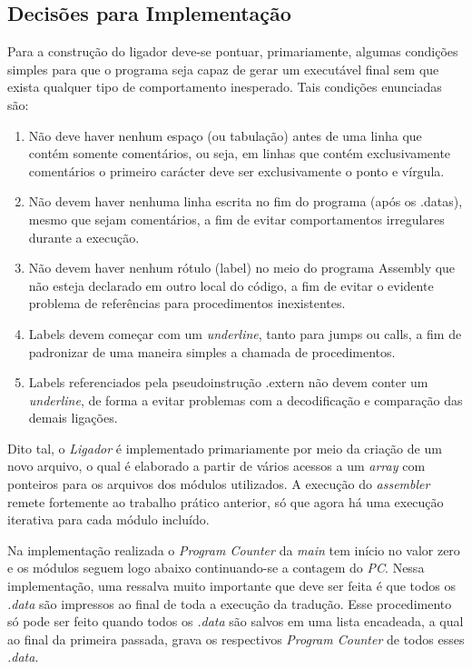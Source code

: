 \documentclass{article}
\begin{document}
\subsection{Decisões para Implementação}
Para a construção do ligador deve-se pontuar, primariamente, algumas condições simples para que o programa seja capaz de gerar um executável final sem que exista qualquer tipo de comportamento inesperado. Tais condições enunciadas são:

\begin{enumerate}
  \item Não deve haver nenhum espaço (ou tabulação) antes de uma linha que contém somente comentários, ou seja, em linhas que contém exclusivamente comentários o primeiro carácter deve ser exclusivamente o ponto e vírgula.
  \item Não devem haver nenhuma linha escrita no fim do programa (após os .datas), mesmo que sejam comentários, a fim de evitar comportamentos irregulares durante a execução.
  \item Não devem haver nenhum rótulo (label) no meio do programa Assembly que não esteja declarado em outro local do código, a fim de evitar o evidente problema de referências para procedimentos inexistentes.
  \item Labels devem começar com um \textit{underline}, tanto para jumps ou calls, a fim de padronizar de uma maneira simples a chamada de procedimentos.
  \item Labels referenciados pela pseudoinstrução .extern não devem conter um \textit{underline}, de forma a evitar problemas com a decodificação e comparação das demais ligações.
\end{enumerate}

Dito tal, o \textit{Ligador} é implementado primariamente por meio da criação de um novo arquivo, o qual é elaborado a partir de vários acessos a um \textit{array} com ponteiros para os arquivos dos módulos utilizados. A execução do \textit{assembler} remete fortemente ao trabalho prático anterior, só que agora há uma execução iterativa para cada módulo incluído.

Na implementação realizada o \textit{Program Counter} da \textit{main} tem início no valor zero e os módulos seguem logo abaixo continuando-se a contagem do \textit{PC}. Nessa implementação, uma ressalva muito importante que deve ser feita é que todos os \textit{.data} são impressos ao final de toda a execução da tradução. Esse procedimento só pode ser feito quando todos os \textit{.data} são salvos em uma lista encadeada, a qual ao final da primeira passada, grava os respectivos \textit{Program Counter} de todos esses \textit{.data}.
\end{document}
